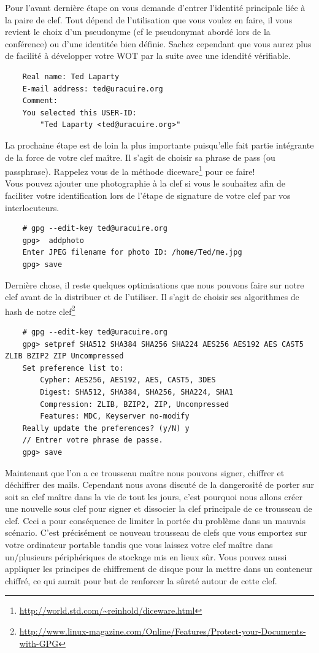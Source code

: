 \documentclass[a4paper]{article}
\begin{document}
Pour l'avant dernière étape on vous demande d'entrer l'identité principale liée
à la paire de clef. Tout dépend de l'utilisation que vous voulez en faire, il
vous revient le choix d'un pseudonyme (cf le pseudonymat abordé lors de la
conférence) ou d'une identitée bien définie. Sachez cependant que vous aurez
plus de facilité à développer votre \textsc{WOT} par la suite avec une idendité
vérifiable.

\begin{verbatim}
    Real name: Ted Laparty
    E-mail address: ted@uracuire.org
    Comment:
    You selected this USER-ID:
        "Ted Laparty <ted@uracuire.org>"
\end{verbatim}

La prochaine étape est de loin la plus importante puisqu'elle fait partie
intégrante de la force de votre clef maître. Il s'agit de choisir sa phrase
de pass (ou passphrase). Rappelez vous de la méthode
diceware\protect\footnote{\url{http://world.std.com/~reinhold/diceware.html}} %
pour ce faire!
\\
Vous pouvez ajouter une photographie à la clef si vous le souhaitez afin de
faciliter votre identification lors de l'étape de signature de votre clef par
vos interlocuteurs.

\begin{verbatim}
    # gpg --edit-key ted@uracuire.org
    gpg>  addphoto
    Enter JPEG filename for photo ID: /home/Ted/me.jpg
    gpg> save
\end{verbatim}

Dernière chose, il reste quelques optimisations que nous pouvons faire sur
notre clef avant de la distribuer et de l'utiliser. Il s'agit de choisir ses
algorithmes de hash de notre
clef\protect\footnote{\url{http://www.linux-magazine.com/Online/Features/Protect-your-Documents-with-GPG}}

\begin{verbatim}
    # gpg --edit-key ted@uracuire.org
    gpg> setpref SHA512 SHA384 SHA256 SHA224 AES256 AES192 AES CAST5 ZLIB BZIP2 ZIP Uncompressed
    Set preference list to:
        Cypher: AES256, AES192, AES, CAST5, 3DES
        Digest: SHA512, SHA384, SHA256, SHA224, SHA1
        Compression: ZLIB, BZIP2, ZIP, Uncompressed
        Features: MDC, Keyserver no-modify
    Really update the preferences? (y/N) y
    // Entrer votre phrase de passe.
    gpg> save
\end{verbatim}

Maintenant que l'on a ce trousseau maître nous pouvons signer, chiffrer et
déchiffrer des mails. Cependant nous avons discuté de la dangerosité de porter
sur soit sa clef maître dans la vie de tout les jours, c'est pourquoi nous
allons créer une nouvelle sous clef pour signer et dissocier la clef principale
de ce trousseau de clef. Ceci a pour conséquence de limiter la portée du
problème dans un mauvais scénario. C'est précisément ce nouveau trousseau de
clefs que vous emportez sur votre ordinateur portable tandis que vous laissez
votre clef maître dans un/plusieurs périphériques de stockage mis en lieux sûr.
Vous pouvez aussi appliquer les principes de chiffrement de disque pour la
mettre dans un conteneur chiffré, ce qui aurait pour but de renforcer la
sûreté autour de cette clef.
\end{document}
